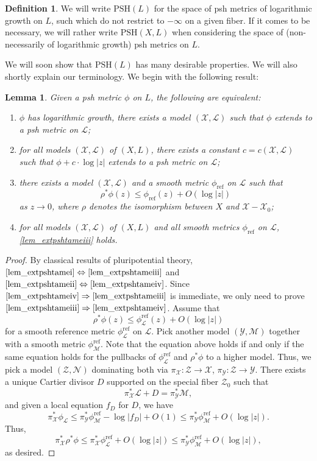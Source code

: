 \documentclass[JEP,XML,SOM,Unicode,NoEqCountersInSection,published]{cedram}
\newenvironment{enumeratei}
{\bgroup\def\theenumi{\roman{enumi}}\def\theenumii{\arabic{enumii}}\begin{enumerate}}
{\end{enumerate}\egroup}
\newtheorem{lemma}[theorem]{Lemma}
\theoremstyle{definition}
\newtheorem{defi}[theorem]{Definition}
\newcommand\cL{\mathcal{L}}
\newcommand\cM{\mathcal{M}}
\newcommand\cN{\mathcal{N}}
\newcommand\cX{\mathcal{X}}
\newcommand\cY{\mathcal{Y}}
\newcommand\cZ{\mathcal{Z}}
\newcommand\PSH{\mathrm{PSH}}
\newcommand\refmetric{\phi_{\mathrm{ref}}}
\begin{document}
\begin{defi}\label{def_psh2}We will write $\PSH(L)$ for the space of psh metrics of logarithmic growth on $L$, such which do not restrict to $-\infty$ on a given fiber. If it comes to be necessary, we will rather write $\PSH(X,L)$ when considering the space of (non-necessarily of logarithmic growth) psh metrics on $L$.
\end{defi}

We will soon show that $\PSH(L)$ has many desirable properties. We will also shortly explain our terminology. We begin with the following result:
\begin{lemma}\label{lem_extpshtame}Given a psh metric $\phi$ on $L$, the following are equivalent:
\begin{enumeratei}
\item\label{lem_extpshtamei} $\phi$ has logarithmic growth, \ie there exists a model $(\cX,\cL)$ such that $\phi$ extends to a psh metric on $\cL$;
\item\label{lem_extpshtameii} for all models $(\cX,\cL)$ of $(X,L)$, there exists a constant $c=c(\cX,\cL)$ such that $\phi+c\cdot \log|z|$ extends to a psh metric on $\cL$;
\item\label{lem_extpshtameiii} there exists a model $(\cX,\cL)$ and a smooth metric $\refmetric$ on $\cL$ such that
\[
\rho^*\phi(z) \leq \refmetric(z) + O(\log |z|)
\]
as $z\to 0$, where $\rho$ denotes the isomorphism between $X$ and $\cX-\cX_0$;
\item\label{lem_extpshtameiv} for all models $(\cX,\cL)$ of $(X,L)$ and all smooth metrics $\refmetric$ on $\cL
$, \eqref{lem_extpshtameiii} holds.
\end{enumeratei}
\end{lemma}
\begin{proof}
By classical results of pluripotential theory, $\eqref{lem_extpshtamei}\Leftrightarrow\eqref{lem_extpshtameiii}$ and $\eqref{lem_extpshtameii}\Leftrightarrow\eqref{lem_extpshtameiv}$. Since $\eqref{lem_extpshtameiv}\Rightarrow\eqref{lem_extpshtameiii}$ is immediate, we only need to prove $\eqref{lem_extpshtameiii}\Rightarrow\eqref{lem_extpshtameiv}$. Assume that
\[
\rho^*\phi(z) \leq \phi^\mathrm{ref}_\cL(z) + O(\log |z|)
\]
for a smooth reference metric $\phi^\mathrm{ref}_\cL$ on $\cL$. Pick another model $(\cY,\cM)$ together with a smooth metric $\phi^\mathrm{ref}_\cM$. Note that the equation above holds if and only if the same equation holds for the pullbacks of $\phi^\mathrm{ref}_\cL$ and $\rho^*\phi$ to a higher model. Thus, we pick a model $(\cZ,\cN)$ dominating both via $\pi_\cX:\cZ\to \cX$, $\pi_\cY:\cZ\to\cY$. There exists a unique Cartier divisor $D$ supported on the special fiber $\cZ_0$ such that\vspace*{-3pt}
\[
\pi_\cX^*\cL+D=\pi_\cY^*\cM,
\]
and given a local equation $f_D$ for $D$, we have\vspace*{-3pt}
\[
\pi_\cX^*\phi_\cL \leq \pi_\cY^*\phi^\mathrm{ref}_\cM - \log|f_D| + O(1)\leq \pi_\cY^*\phi^\mathrm{ref}_\cM + O(\log|z|).
\]
Thus,\vspace*{-3pt}
\[
\pi_\cX^*\rho^*\phi\leq \pi_\cX^*\phi^\mathrm{ref}_\cL + O(\log|z|)\leq \pi_\cY^*\phi^\mathrm{ref}_\cM + O(\log|z|),
\]
as desired.
\end{proof}
\end{document}
